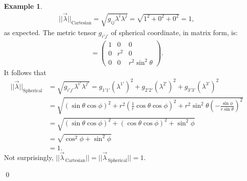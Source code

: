 \documentclass{book}
\theoremstyle{definition}
\newtheorem{exmp}{Example}[section]
\begin{document}
\begin{exmp}
	\begin{align*}
	\vert\vert \vec{\lambda} \vert\vert_{\text{Cartesian}} = \sqrt{g_{ij}\lambda^i\lambda^j} = \sqrt{1^2 + 0^2 + 0^2} = 1,
	\end{align*}
	as expected. The metric tensor $g_{i'j'}$ of spherical coordinate, in matrix form, is:
	\begin{align*}
	[g_{i'j'}] = \begin{pmatrix}
	1 & 0 & 0\\
	0 & r^2 & 0\\
	0 & 0 & r^2\sin^2\theta
	\end{pmatrix}.
	\end{align*}
	It follows that
	\begin{align*}
	\vert\vert \vec{\lambda} \vert\vert_{\text{Spherical}} &= \sqrt{g_{i'j'}\lambda^{i'}\lambda^{j'}} = g_{1'1'}\left( \lambda^{1'}\right) ^2 + g_{2'2'}\left( \lambda^{2'}\right) ^2 + g_{3'3'}\left( \lambda^{3'}\right) ^2\\
	&= \sqrt{\left( \sin\theta\cos\phi\right)^2 + r^2\left(\frac{1}{r}\cos\theta\cos\phi \right)^2 + r^2\sin^2\theta\left(-\frac{\sin\phi}{r\sin\theta} \right)^2  }\\
	&= \sqrt{\left( \sin\theta\cos\phi\right)^2 + \left(\cos\theta\cos\phi \right)^2 + \sin^2\phi}\\
	&= \sqrt{\cos^2\phi + \sin^2\phi}\\
	&= 1.
	\end{align*}
	Not surprisingly, $\vert\vert \vec{\lambda}_{\,\text{Cartesian}} \vert\vert = \vert\vert \vec{\lambda}_{\,\text{Spherical}} \vert\vert = 1$.
\end{exmp}\qed
\end{document}
